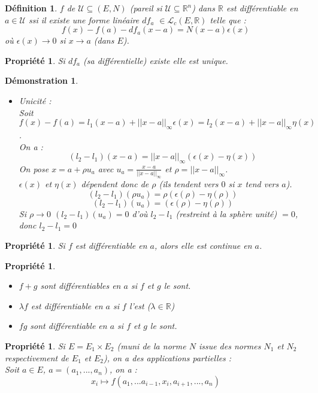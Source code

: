 \documentclass[a4paper, oneside]{report}
\theoremstyle{break}
\newtheorem{defi}[thm]{Définition}
\newtheorem{propr}[thm]{Propriété}
\newtheorem*{demo}{Démonstration}
\newcommand{\x}{\times}
\newcommand{\R}{\mathbb{R}}
\newcommand{\U}{\mathcal{U}}
\renewcommand{\L}{\mathcal{L}}
\begin{document}
\begin{defi}
$f$ de $\U \subseteq (E,N)$ (pareil si $\U \subseteq \R^n$) dans $\R$ est différentiable en $a\in \U$ ssi il existe une forme linéaire $df_a$ $\in \L_c(E,\R)$ telle que :
$$f(x)-f(a)-df_a(x-a)=N(x-a) \epsilon(x)$$
où $\epsilon(x)\rightarrow 0$ si $x\rightarrow a$ (dans $E$).\\
\end{defi}

\begin{propr}
Si $df_a$ (sa différentielle) existe elle est unique.
\end{propr}

\begin{demo}
\begin{itemize}
\item Unicité :\\
Soit $f(x)-f(a)=l_1(x-a)+||x-a||_\infty \epsilon (x)=l_2(x-a)+||x-a||_\infty \eta (x)$.\\
On a :
$$(l_2-l_1)(x-a)=||x-a||_\infty (\epsilon(x)-\eta(x))$$
On pose $x=a+\rho u_a$ avec $u_a=\frac{x-a}{||x-a||_\infty}$ et $\rho=||x-a||_\infty$.\\
$\epsilon(x)$ et $\eta(x)$ dépendent donc de $\rho$ (ils tendent vers $0$ si $x$ tend vers $a$).
$$(l_2-l_1)(\rho u_a)=\rho (\epsilon(\rho)-\eta(\rho))$$
$$(l_2-l_1)(u_a)=(\epsilon(\rho)-\eta(\rho))$$
Si $\rho \rightarrow 0$ $(l_2-l_1)(u_a)=0$ d'où $l_2-l_1$ (restreint à la sphère unité) $=0$, donc $l_2-l_1=0$
\end{itemize}
\end{demo}

\begin{propr}
Si $f$ est différentiable en $a$, alors elle est continue en $a$.
\end{propr}

\begin{propr}
\begin{itemize}
\item $f+g$ sont différentiables en $a$ si $f$ et $g$ le sont.
\item $\lambda f$ est différentiable en $a$ si $f$ l'est ($\lambda \in \R$)
\item $fg$ sont différentiable en $a$ si $f$ et $g$ le sont.
\end{itemize}
\end{propr}

\begin{propr}
Si $E=E_1\x E_2$ (muni de la norme $N$ issue des normes $N_1$ et $N_2$ respectivement de $E_1$ et $E_2$), on a des applications partielles :\\
Soit $a\in E$, $a=(a_1,...,a_n)$, on a :
$$x_i \mapsto f(a_1,...a_{i-1},x_i,a_{i+1},...,a_n)$$
\end{propr}
\end{document}
